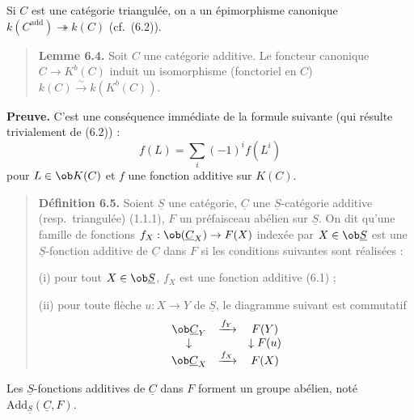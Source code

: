 Si $C$ est une catégorie triangulée, on a un épimorphisme canonique $k(C^{\mathrm{add}}) \twoheadrightarrow k(C)$ (cf.\ (6.2)).

\begin{quote}
\textbf{Lemme 6.4.} Soit $C$ une catégorie additive. Le foncteur canonique $C \to K^b(C)$ induit un isomorphisme (fonctoriel en $C$) $k(C) \xrightarrow{\sim} k(K^b(C))$.
\end{quote}

\textbf{Preuve.} C'est une conséquence immédiate de la formule suivante (qui résulte trivialement de (6.2)) :
\[
f(L) = \sum_i (-1)^i f(L^i) \tag{6.4.1}
\]
pour $L \in \ob K(C)$ et $f$ une fonction additive sur $K(C)$.

\begin{quote}
\textbf{Définition 6.5.} Soient $\underline{S}$ une catégorie, $\underline{C}$ une $\underline{S}$-catégorie additive (resp.\ triangulée) (1.1.1), $F$ un préfaisceau abélien sur $\underline{S}$. On dit qu'une famille de fonctions $f_X : \ob(\underline{C}_X) \to F(X)$ indexée par $X \in \ob \underline{S}$ est une $\underline{S}$-fonction additive de $\underline{C}$ dans $F$ si les conditions suivantes sont réalisées :

(i) pour tout $X \in \ob \underline{S}$, $f_X$ est une fonction additive (6.1) ;

(ii) pour toute flèche $u : X \to Y$ de $\underline{S}$, le diagramme suivant est commutatif
\[
\begin{array}{ccc}
\ob \underline{C}_Y & \xrightarrow{f_Y} & F(Y) \\
\downarrow & & \downarrow F(u) \\
\ob \underline{C}_X & \xrightarrow{f_X} & F(X)
\end{array}
\]
\end{quote}

Les $\underline{S}$-fonctions additives de $\underline{C}$ dans $F$ forment un groupe abélien, noté $\mathrm{Add}_{\underline{S}}(\underline{C}, F)$.

